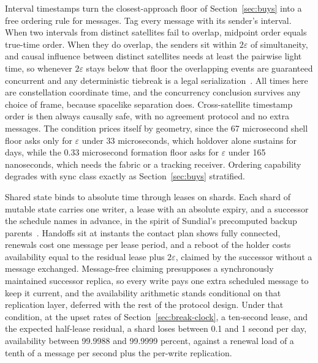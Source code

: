 \documentclass[twocolumn,10pt]{article}
\begin{document}
Interval timestamps turn the closest-approach floor of Section~\ref{sec:buys} into a free ordering rule for messages. Tag every message with its sender's interval. When two intervals from distinct satellites fail to overlap, midpoint order equals true-time order. When they do overlap, the senders sit within $2\varepsilon$ of simultaneity, and causal influence between distinct satellites needs at least the pairwise light time, so whenever $2\varepsilon$ stays below that floor the overlapping events are guaranteed concurrent and any deterministic tiebreak is a legal serialization~\cite{lamport1978}. All times here are constellation coordinate time, and the concurrency conclusion survives any choice of frame, because spacelike separation does. Cross-satellite timestamp order is then always causally safe, with no agreement protocol and no extra messages. The condition prices itself by geometry, since the 67 microsecond shell floor asks only for $\varepsilon$ under 33 microseconds, which holdover alone sustains for days, while the 0.33 microsecond formation floor asks for $\varepsilon$ under 165 nanoseconds, which needs the fabric or a tracking receiver. Ordering capability degrades with sync class exactly as Section~\ref{sec:buys} stratified.

Shared state binds to absolute time through leases on shards. Each shard of mutable state carries one writer, a lease with an absolute expiry, and a successor the schedule names in advance, in the spirit of Sundial's precomputed backup parents~\cite{li2020}. Handoffs sit at instants the contact plan shows fully connected, renewals cost one message per lease period, and a reboot of the holder costs availability equal to the residual lease plus $2\varepsilon$, claimed by the successor without a message exchanged. Message-free claiming presupposes a synchronously maintained successor replica, so every write pays one extra scheduled message to keep it current, and the availability arithmetic stands conditional on that replication layer, deferred with the rest of the protocol design. Under that condition, at the upset rates of Section~\ref{sec:break-clock}, a ten-second lease, and the expected half-lease residual, a shard loses between 0.1 and 1 second per day, availability between 99.9988 and 99.9999 percent, against a renewal load of a tenth of a message per second plus the per-write replication.
\end{document}
